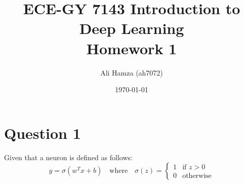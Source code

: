 \documentclass{article}
\title{ECE-GY 7143 Introduction to Deep Learning \\ \Large Homework 1}
\author{Ali Hamza (ah7072)}
\date{\today}
\newenvironment{solution}{\noindent\textbf{Solution:} }{\qed}
\begin{document}
\maketitle
\newpage
\section*{Question 1}
Given that a neuron is defined as follows:
\begin{equation}
    y = \sigma(w^T x + b) \quad \text{where} \quad \sigma(z) = \begin{cases}
        1 & \text{if } z > 0 \\
        0 & \text{otherwise}
    \end{cases}
\end{equation}
    
\end{document}

